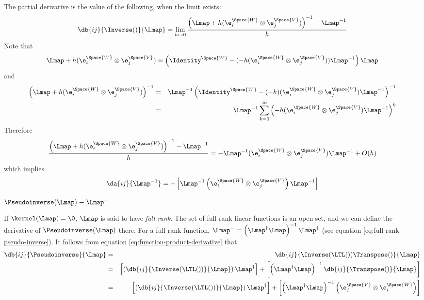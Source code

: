 The partial derivative is the value of the following, when the limit exists:
\begin{displaymath}
\db{ij}{\Inverse()}{\Lmap}
 =
\lim_{ h \mapsto 0}
\frac{ \left( \Lmap + h (\e_i^{\Space{W}} \otimes \e_j^{\Space{V}}) \right)^{-1} - \Lmap^{-1} }{h}
\end{displaymath}
Note that
\begin{displaymath}
\Lmap + h (\e_i^{\Space{W}} \otimes \e_j^{\Space{V}})
 =
\left( \Identity^{\Space{W}} - ( -h ( \e_i^{\Space{W}} \otimes \e_j^{\Space{V}} )) \Lmap^{-1} \right) \Lmap
\end{displaymath}
and
\begin{eqnarray*}
\left( \Lmap + h (\e_i^{\Space{W}} \otimes \e_j^{\Space{V}}) \right)^{-1}
& = &
\Lmap^{-1} \left( \Identity^{\Space{W}} - ( -h )( \e_i^{\Space{W}} \otimes \e_j^{\Space{V}} ) \Lmap^{-1} \right)^{-1}
\\
& = &
\Lmap^{-1} \sum_{k=0}^{\infty} \left( -h ( \e_i^{\Space{W}} \otimes \e_j^{\Space{V}} ) \Lmap^{-1} \right)^{k}
\nonumber
\end{eqnarray*}
Therefore
\begin{displaymath}
\frac{ \left( \Lmap + h (\e_i^{\Space{W}} \otimes \e_j^{\Space{V}}) \right)^{-1} - \Lmap^{-1} }{h}
 =
- \Lmap^{-1} ( \e_i^{\Space{W}} \otimes \e_j^{\Space{V}} )  \Lmap^{-1} + O(h)
\end{displaymath}
which implies
\begin{equation}
\da{ij}{\Lmap^{-1}}
 =
- \left[
\Lmap^{-1}
\left( \e_i^{\Space{W}} \otimes \e_j^{\Space{V}} \right)
\Lmap^{-1}
\right]
\end{equation}


\label{sec:Derivative-of-pseudo-inverse}

$\Pseudoinverse(\Lmap) \equiv \Lmap^{-}$

If $\kernel(\Lmap) = \0$, $\Lmap$ is said to have \textit{full rank}.
The set of full rank linear functions is an open set,
and we can define the derivative of $\Pseudoinverse(\Lmap)$ there.
For a full rank function,
$\Lmap^{-} = \left( \Lmap^{\dagger} \Lmap \right)^{-1} \Lmap^{\dagger}$
(see equation \ref{eq:full-rank-pseudo-inverse}).
It follows from equation \ref{eq:function-product-derivative} that
\begin{eqnarray}
\db{ij}{\Pseudoinverse}{\Lmap}
& = &
\db{ij}{\Inverse(\LTL())\Transpose()}{\Lmap}
\\
& = &
\left[
\left( \db{ij}{\Inverse(\LTL())}{\Lmap} \right)
\Lmap^{\dagger}
\right]
+
\left[
\left( \Lmap^{\dagger} \Lmap \right)^{-1}
\db{ij}{\Transpose()}{\Lmap}
\right]
\nonumber
\\
& = &
\left[
\left( \db{ij}{\Inverse(\LTL())}{\Lmap} \right)
\Lmap^{\dagger}
\right]
+
\left[
\left( \Lmap^{\dagger} \Lmap \right)^{-1}
\left( \e_j^{\Space{V}} \otimes \e_i^{\Space{W}} \right)
\right]
\nonumber
\end{eqnarray}


